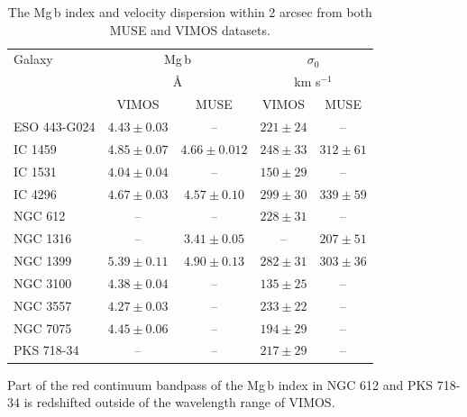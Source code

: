 			\begin{table}
				\centering
			\begin{threeparttable}
				\caption{The Mg\,b index and velocity dispersion within 2 arcsec from both MUSE and VIMOS datasets.}
				\label{tab:globalMg}
				\begin{tabular}{l c c c c}
					\hline
					\hline
					Galaxy 	& \multicolumn{2}{c}{Mg\,b} & \multicolumn{2}{c}{$\sigma_0$} \\
						& \multicolumn{2}{c}{\AA} & \multicolumn{2}{c}{km s$^{-1}$} \\
						& VIMOS & MUSE 	& VIMOS & MUSE \\
					\hline
					ESO 443-G024 & $4.43 \pm 0.03$ & -- & $221 \pm 24$ & -- \\
					IC 1459 	& $4.85\pm0.07$ & $4.66 \pm 0.012$ & $248\pm33$ & $312 \pm 61$ \\
					IC 1531 	& $4.04 \pm 0.04$ & -- & $150 \pm 29$ & -- \\
					IC 4296		& $4.67\pm0.03$ & $4.57 \pm 0.10$ &  $299\pm30$ & $339 \pm 59$ \\
					NGC 612 	& -- & -- & $228 \pm 31$ & -- \\
					NGC 1316 	& -- & $3.41 \pm 0.05$ & -- & $207 \pm 51$ \\
					NGC 1399 	& $5.39\pm0.11$ & $4.90 \pm 0.13$ & $282\pm31$ & $303 \pm 36$ \\
					NGC 3100 	& $4.38 \pm 0.04$ & -- & $135 \pm 25$ & -- \\
					NGC 3557 	& $4.27 \pm 0.03$ & -- & $233 \pm 22$ & -- \\
					NGC 7075 	& $4.45 \pm 0.06$ & -- & $194 \pm 29$ & -- \\
					PKS 718-34  & -- 		      & -- & $217 \pm 29$ & -- \\
					\hline
					\hline
				\end{tabular}
				\begin{tablenotes}
				\footnotesize
				\note Part of the red continuum bandpass of the Mg\,b index in NGC 612 and PKS 718-34 is redshifted outside of the wavelength range of VIMOS.
				\end{tablenotes}
			\end{threeparttable}
			\end{table}


